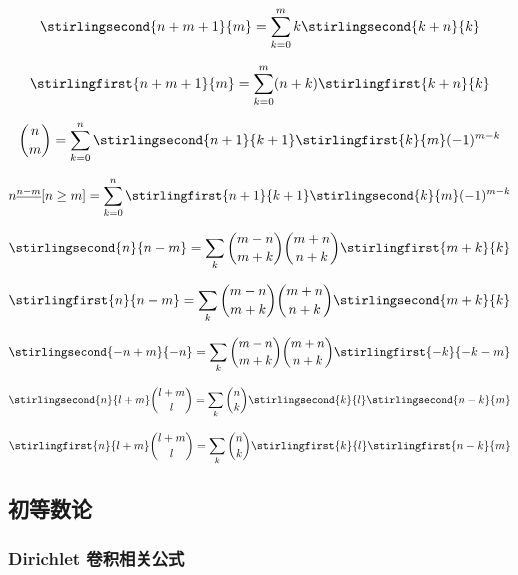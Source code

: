 \begin{equation}
    \stirlingsecond{n+m+1}{m}=\sum_{k=0}^mk\stirlingsecond{k+n}{k}
\end{equation}

\begin{equation}
    \stirlingfirst{n+m+1}{m}=\sum_{k=0}^m(n+k)\stirlingfirst{k+n}{k}
\end{equation}

\begin{equation}
    \binom{n}{m}=\sum_{k=0}^n\stirlingsecond{n+1}{k+1}\stirlingfirst{k}{m}(-1)^{m-k}
\end{equation}

\begin{equation}
    n^{\underline{n-m}}[n\geq m]=\sum_{k=0}^n\stirlingfirst{n+1}{k+1}\stirlingsecond{k}{m}(-1)^{m-k}
\end{equation}

\begin{equation}
    \stirlingsecond{n}{n-m}=\sum_k\binom{m-n}{m+k}\binom{m+n}{n+k}\stirlingfirst{m+k}{k}
\end{equation}

\begin{equation}
    \stirlingfirst{n}{n-m}=\sum_k\binom{m-n}{m+k}\binom{m+n}{n+k}\stirlingsecond{m+k}{k}
\end{equation}

\begin{equation}
    \stirlingsecond{-n+m}{-n}=\sum_k\binom{m-n}{m+k}\binom{m+n}{n+k}\stirlingfirst{-k}{-k-m}
\end{equation}

\begin{equation}
    \stirlingsecond{n}{l+m}\binom{l+m}{l}=\sum_k\binom{n}{k}\stirlingsecond{k}{l}\stirlingsecond{n-k}{m}
\end{equation}

\begin{equation}
    \stirlingfirst{n}{l+m}\binom{l+m}{l}=\sum_k\binom{n}{k}\stirlingfirst{k}{l}\stirlingfirst{n-k}{m}
\end{equation}

\subsection{初等数论}

\subsubsection{Dirichlet 卷积相关公式}

